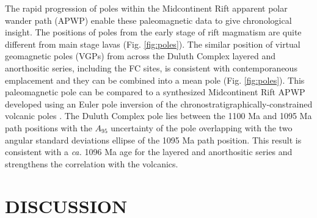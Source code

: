 \documentclass[11pt,letterpaper]{article}
\begin{document}
The rapid progression of poles within the Midcontinent Rift apparent polar wander path (APWP) enable these paleomagnetic data to give chronological insight. The positions of poles from the early stage of rift magmatism are quite different from main stage lavas (Fig. \ref{fig:poles}). The similar position of virtual geomagnetic poles (VGPs) from across the Duluth Complex layered and anorthositic series, including the FC sites, is consistent with contemporaneous emplacement and they can be combined into a mean pole (Fig. \ref{fig:poles}). This paleomagnetic pole can be compared to a synthesized Midcontinent Rift APWP developed using an Euler pole inversion of the chronostratigraphically-constrained volcanic poles \citep{Swanson-Hysell2019a}. The Duluth Complex pole lies between the 1100 Ma and 1095 Ma path positions with the $A_{95}$ uncertainty of the pole overlapping with the two angular standard deviations ellipse of the 1095 Ma path position. This result is consistent with a \textit{ca.} 1096 Ma age for the layered and anorthositic series and strengthens the correlation with the volcanics.


\section*{DISCUSSION}
\end{document}
